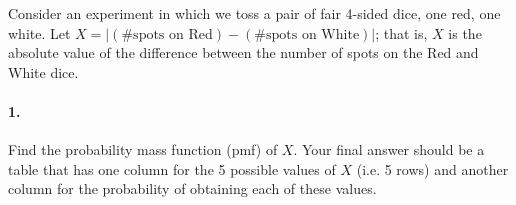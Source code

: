 


\renewcommand\assignment{Worksheet 9, Due Wednesday, February 8, 4:15pm}


    \iffalse
    \begin{equation*}
        \begin{gathered}
            Equations go here.
        \end{gathered}
    \end{equation*}

    \resizebox{\hsize}{!}{$Long equation goes here$}

    \begin{multicol*}{# of columns}
    \end{multicol*}

    \horizontal

    \fi


    Consider an experiment in which we toss a pair of fair 4-sided dice, one red, one white. Let $X = |(\text{\# spots on Red}) - (\text{\# spots on White}) |$; that is, $X$ is the absolute value of the difference between the number of spots on the Red and White dice.
    
    \paragraph*{1.} Find the probability mass function (pmf) of $X$.
    Your final answer should be a table that has one column for the 5 possible values of $X$
    (i.e. 5 rows) and another column for the probability of obtaining each of these values.

